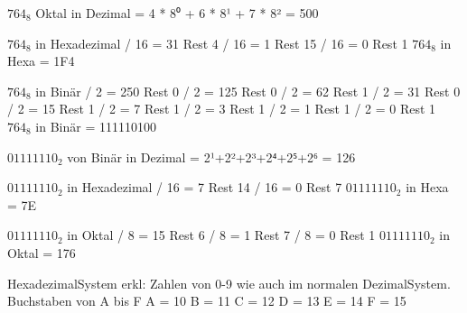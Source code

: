 \documentclass[a4paper,11pt,titlepage]{article}
\begin{document}
\pagebreak

$764_8$ Oktal in Dezimal \newline
= 4 * 8⁰ + 6 * 8¹ + 7 * 8² \newline
= 500\newline

$764_8$ in Hexadezimal  / 16 = 31 Rest 4  / 16 =  1 Rest 15  / 16 =  0 Rest 1 \newline
$764_8$ in Hexa = 1F4 \newline

$764_8$ in Bin\"ar  / 2 = 250 Rest 0  / 2 = 125 Rest 0  / 2 =  62 Rest 1  / 2 =  31 Rest 0  / 2 =  15 Rest 1  / 2 =   7 Rest 1  / 2 =   3 Rest 1  / 2 =   1 Rest 1  / 2 =   0 Rest 1 \newline
 $764_8$ in Bin\"ar = 111110100





$01111110_2$ von Bin\"ar in Dezimal \newline
= 2¹+2²+2³+2⁴+2⁵+2⁶ \newline
= 126 \newline

$01111110_2$ in Hexadezimal  / 16 = 7 Rest 14  / 16 = 0 Rest  7 \newline
$01111110_2$ in Hexa = 7E

$01111110_2$ in Oktal  / 8 = 15 Rest 6  / 8 =  1 Rest 7  / 8 =  0 Rest 1 \newline
$01111110_2$ in Oktal = 176


 

HexadezimalSystem erkl: \newline
Zahlen von 0-9 wie auch im normalen DezimalSystem. \newline
Buchstaben von A bis F\newline
A = 10 \newline
B = 11 \newline
C = 12 \newline
D = 13 \newline
E = 14 \newline
F = 15 \newline
\end{document}
